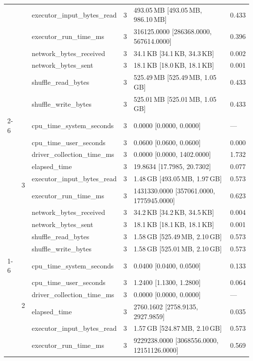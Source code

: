 \begin{tabular}{lllrll}
 &  & executor_input_bytes_read & 3 & 493.05\,MB [493.05\,MB, 986.10\,MB] & 0.433 \\
 &  & executor_run_time_ms & 3 & 316125.0000 [286368.0000, 567614.0000] & 0.396 \\
 &  & network_bytes_received & 3 & 34.1\,KB [34.1\,KB, 34.3\,KB] & 0.002 \\
 &  & network_bytes_sent & 3 & 18.1\,KB [18.0\,KB, 18.1\,KB] & 0.001 \\
 &  & shuffle_read_bytes & 3 & 525.49\,MB [525.49\,MB, 1.05\,GB] & 0.433 \\
 &  & shuffle_write_bytes & 3 & 525.01\,MB [525.01\,MB, 1.05\,GB] & 0.433 \\
\cline{2-6}
 & \multirow[t]{10}{*}{3} & cpu_time_system_seconds & 3 & 0.0000 [0.0000, 0.0000] & --- \\
 &  & cpu_time_user_seconds & 3 & 0.0600 [0.0600, 0.0600] & 0.000 \\
 &  & driver_collection_time_ms & 3 & 0.0000 [0.0000, 1402.0000] & 1.732 \\
 &  & elapsed_time & 3 & 19.8634 [17.7985, 20.7302] & 0.077 \\
 &  & executor_input_bytes_read & 3 & 1.48\,GB [493.05\,MB, 1.97\,GB] & 0.573 \\
 &  & executor_run_time_ms & 3 & 1431330.0000 [357061.0000, 1775945.0000] & 0.623 \\
 &  & network_bytes_received & 3 & 34.2\,KB [34.2\,KB, 34.5\,KB] & 0.004 \\
 &  & network_bytes_sent & 3 & 18.1\,KB [18.1\,KB, 18.1\,KB] & 0.001 \\
 &  & shuffle_read_bytes & 3 & 1.58\,GB [525.49\,MB, 2.10\,GB] & 0.573 \\
 &  & shuffle_write_bytes & 3 & 1.58\,GB [525.01\,MB, 2.10\,GB] & 0.573 \\
\cline{1-6} \cline{2-6}
\multirow[t]{20}{*}{national-scale-spatial-join-databricks-partitioned-12-nodes-small} & \multirow[t]{10}{*}{2} & cpu_time_system_seconds & 3 & 0.0400 [0.0400, 0.0500] & 0.133 \\
 &  & cpu_time_user_seconds & 3 & 1.2400 [1.1300, 1.2800] & 0.064 \\
 &  & driver_collection_time_ms & 3 & 0.0000 [0.0000, 0.0000] & --- \\
 &  & elapsed_time & 3 & 2760.1602 [2758.9135, 2927.9859] & 0.035 \\
 &  & executor_input_bytes_read & 3 & 1.57\,GB [524.87\,MB, 2.10\,GB] & 0.573 \\
 &  & executor_run_time_ms & 3 & 9229238.0000 [3068556.0000, 12151126.0000] & 0.569 \\

\end{tabular}
